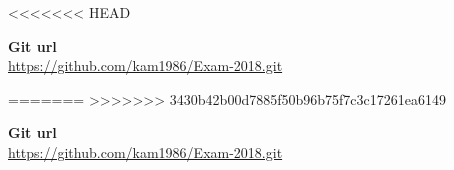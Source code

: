 \documentclass[a4paper]{article}
\begin{document}
\maketitle

<<<<<<< HEAD
\begin{center}
	\textbf{Git url}\\
	\url{https://github.com/kam1986/Exam-2018.git}
\end{center}
=======
>>>>>>> 3430b42b00d7885f50b96b75f7c3c17261ea6149

\center\textbf{Git url}\\
\center\url{https://github.com/kam1986/Exam-2018.git}\\

\newpage
















\end{document}
